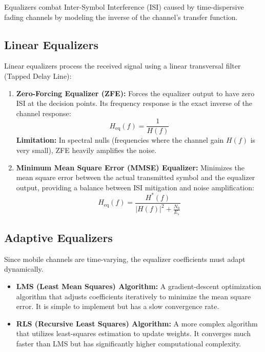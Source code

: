 \documentclass[12pt,a4paper]{article}
\begin{document}
Equalizers combat Inter-Symbol Interference (ISI) caused by time-dispersive fading channels by modeling the inverse of the channel's transfer function.

\subsection{Linear Equalizers}
Linear equalizers process the received signal using a linear transversal filter (Tapped Delay Line):
\begin{enumerate}[label=\textbf{\arabic*.}, leftmargin=*, itemsep=3.5pt]
  \item \textbf{Zero-Forcing Equalizer (ZFE):} Forces the equalizer output to have zero ISI at the decision points. Its frequency response is the exact inverse of the channel response:
    \begin{equation}
      H_{\text{eq}}(f) = \frac{1}{H(f)}
    \end{equation}
    \textbf{Limitation:} In spectral nulls (frequencies where the channel gain $H(f)$ is very small), ZFE heavily amplifies the noise.
  \item \textbf{Minimum Mean Square Error (MMSE) Equalizer:} Minimizes the mean square error between the actual transmitted symbol and the equalizer output, providing a balance between ISI mitigation and noise amplification:
    \begin{equation}
      H_{\text{eq}}(f) = \frac{H^*(f)}{|H(f)|^2 + \frac{N_0}{E_s}}
    \end{equation}
\end{enumerate}

\subsection{Adaptive Equalizers}
Since mobile channels are time-varying, the equalizer coefficients must adapt dynamically.
\begin{itemize}[leftmargin=*, itemsep=3.0pt]
  \item \textbf{LMS (Least Mean Squares) Algorithm:} A gradient-descent optimization algorithm that adjusts coefficients iteratively to minimize the mean square error. It is simple to implement but has a slow convergence rate.
  \item \textbf{RLS (Recursive Least Squares) Algorithm:} A more complex algorithm that utilizes least-squares estimation to update weights. It converges much faster than LMS but has significantly higher computational complexity.
\end{itemize}
\end{document}
